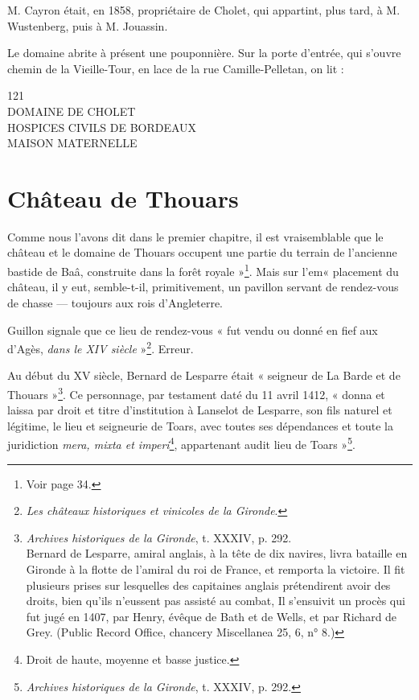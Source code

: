 M. Cayron était, en 1858, propriétaire de Cholet, qui appartint, plus tard, à M. Wustenberg, puis à M. Jouassin.

Le domaine abrite à présent une pouponnière. Sur la porte d'entrée, qui s'ouvre chemin de la Vieille-Tour, en lace de la rue Camille-Pelletan, on lit : 

\begin{center}
121\\DOMAINE DE CHOLET\\HOSPICES CIVILS DE BORDEAUX\\MAISON MATERNELLE
\end{center}

\section{Château de Thouars}

Comme nous l'avons dit dans le premier chapitre, il est vraisemblable que le château et le domaine de Thouars occupent une partie du terrain de l'ancienne bastide de Baâ, construite dans la forêt royale »\footnote{Voir page 34.}. Mais sur l'em« placement du château, il y eut, semble-t-il, primitivement, un pavillon servant de rendez-vous de chasse — toujours aux rois d'Angleterre.

Guillon signale que ce lieu de rendez-vous « fut vendu ou donné en fief aux d'Agès, \textit{dans le XIV\ieme{} siècle} »\footnote{\textit{Les châteaux historiques et vinicoles de la Gironde}.}. Erreur. 

Au début du XV\ieme{} siècle, Bernard de Lesparre était « seigneur de La Barde et de Thouars »\footnote{\textit{Archives historiques de la Gironde}, t. XXXIV, p. 292.\\Bernard de Lesparre, amiral anglais, à la tête de dix navires, livra bataille en Gironde à la flotte de l'amiral du roi de France, et remporta la victoire. Il fit plusieurs prises sur lesquelles des capitaines anglais prétendirent avoir des droits, bien qu'ils n'eussent pas assisté au combat, Il s'ensuivit un procès qui fut jugé en 1407, par Henry, évêque de Bath et de Wells, et par Richard de Grey. (Public Record Office, chancery Miscellanea 25, 6, n° 8.)}. Ce personnage, par testament daté du 11 avril 1412, « donna et laissa par droit et titre d'institution à Lanselot de Lesparre, son fils naturel et légitime, le lieu et seigneurie de Toars, avec toutes ses dépendances et toute la juridiction \textit{mera, mixta et imperi}\footnote{Droit de haute, moyenne et basse justice.}, appartenant audit lieu de Toars »\footnote{\textit{Archives historiques de la Gironde}, t. XXXIV, p. 292.}.

